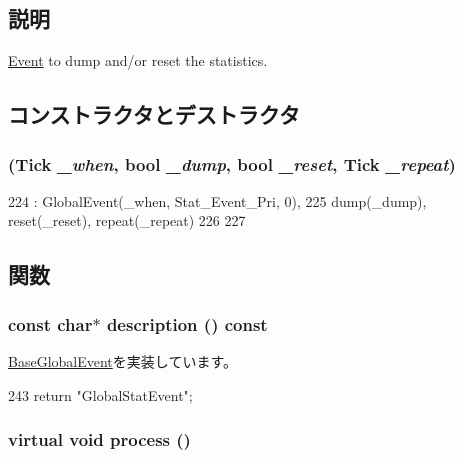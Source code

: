 \subsection{説明}
\hyperlink{classEvent}{Event} to dump and/or reset the statistics. 

\subsection{コンストラクタとデストラクタ}
\hypertarget{classStats_1_1StatEvent_a85b93ac1b7f89e98a895fce4b27cc5f9}{
\subsubsection[{StatEvent}]{ ({\bf Tick} {\em \_\-when}, \/  bool {\em \_\-dump}, \/  bool {\em \_\-reset}, \/  {\bf Tick} {\em \_\-repeat})}}
\label{classStats_1_1StatEvent_a85b93ac1b7f89e98a895fce4b27cc5f9}



\begin{DoxyCode}
224         : GlobalEvent(_when, Stat_Event_Pri, 0),
225           dump(_dump), reset(_reset), repeat(_repeat)
226     {
227     }
\end{DoxyCode}


\subsection{関数}
\hypertarget{classStats_1_1StatEvent_a2bd90422eece9190794479e08092a252}{
\subsubsection[{description}]{\setlength{\rightskip}{0pt plus 5cm}const char$\ast$ description () const}}
\label{classStats_1_1StatEvent_a2bd90422eece9190794479e08092a252}


\hyperlink{classBaseGlobalEvent_aaf0ee88413e805ebda5569f5c13d847f}{BaseGlobalEvent}を実装しています。


\begin{DoxyCode}
243 { return "GlobalStatEvent"; }
\end{DoxyCode}
\hypertarget{classStats_1_1StatEvent_a6780fc1879338e1ff38faf7279ec6a0b}{
\subsubsection[{process}]{\setlength{\rightskip}{0pt plus 5cm}virtual void process ()}}
\label{classStats_1_1StatEvent_a6780fc1879338e1ff38faf7279ec6a0b}


